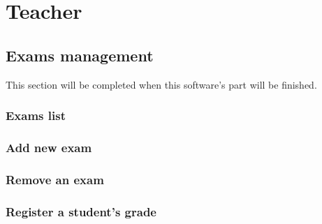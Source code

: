 \documentclass[ManualeUtente]{subfiles}
\begin{document}
\chapter{Teacher}
\section{Exams management}
This section will be completed when this software's part will be finished.
\subsection{Exams list}
\subsection{Add new exam}
\subsection{Remove an exam}
\subsection{Register a student's grade}
\end{document}
